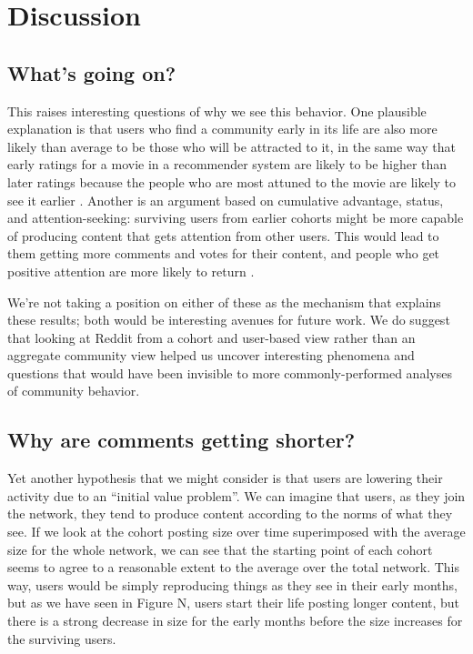 \section{Discussion}

\subsection{What's going on?}

This raises interesting questions of why we see this behavior.  One plausible explanation is that users who find a community early in its life are also more likely than average to be those who will be attracted to it, in the same way that early ratings for a movie in a recommender system are likely to be higher than later ratings because the people who are most attuned to the movie are likely to see it earlier \cite{if_we_can_find_one}.  Another is an argument based on cumulative advantage, status, and attention-seeking: surviving users from earlier cohorts might be more capable of producing content that gets attention from other users.  This would lead to them getting more comments and votes for their content, and people who get positive attention are more likely to return \cite{joyce-kraut, wikipedia, everything2_papers}.  

We're not taking a position on either of these as the mechanism that explains these results; both would be interesting avenues for future work.  We do suggest that looking at Reddit from a cohort and user-based view rather than an aggregate community view helped us uncover interesting phenomena and questions that would have been invisible to more commonly-performed analyses of community behavior. 

\subsection{Why are comments getting shorter?}

Yet another hypothesis that we might consider is that users are lowering their activity due to an ``initial value problem''. We can imagine that users, as they join the network, they tend to produce content according to the norms of what they see. If we look at the cohort posting size over time superimposed with the average size for the whole network, we can see that the starting point of each cohort seems to agree to a reasonable extent to the average over the total network. This way, users would be simply reproducing things as they see in their early months, but as we have seen in Figure N, users start their life posting longer content, but there is a strong decrease in size for the early months before the size increases for the surviving users.

